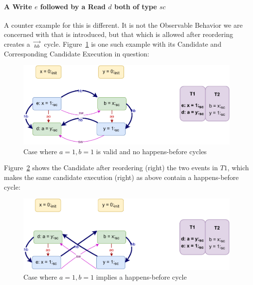         
    \paragraph{A Write $e$ followed by a Read $d$ both of type $sc$}
        
        A counter example for this is different. 
        It is not the Observable Behavior we are concerned with that is introduced, but that which is allowed after reordering creates a $\stackrel{\longrightarrow}{_{hb}}$ cycle. 
        Figure~\ref{reord_counter:example3(a)} is one such example with its Candidate and Corresponding Candidate Execution in question:
        \begin{figure}[H]
            \centering
            \includegraphics[scale=0.7]{7.CounterExamples/ReorderingCandidate/Example5(Wsc-Rsc).pdf}
            \caption{Case where $a = 1, b = 1$ is valid and no happens-before cycles}
            \label{reord_counter:example3(a)}
        \end{figure}

        Figure~\ref{reord_counter:example3(b)} shows the Candidate after reordering (right) the two events in $T1$, which makes the same candidate execution (right) as above contain a happens-before cycle:
        \begin{figure}[H]
            \centering
            \includegraphics[scale=0.7]{7.CounterExamples/ReorderingCandidate/Example5R(Wsc-Rsc).pdf}
            \caption{Case where $a = 1, b = 1$ implies a happens-before cycle}
            \label{reord_counter:example3(b)}
        \end{figure}

